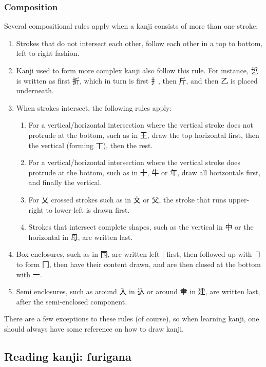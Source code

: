 \documentclass[11pt, b5paper, twoside, openright, onecolumn]{book}
\begin{document}
\subsubsection{Composition}


Several compositional rules apply when a kanji consists of more than one stroke:

\begin{enumerate}
\item Strokes that do not intersect each other‚ follow each other in a top to bottom‚ left to right fashion.
\item Kanji used to form more complex kanji also follow this rule. For instance‚ 乴 is written as first 折‚ which in turn is first 扌‚ then 斤‚ and then 乙 is placed underneath.
\item When strokes intersect‚ the following rules apply:
\begin{enumerate}
\item For a vertical/horizontal intersection where the vertical stroke does not protrude at the bottom‚ such as in 王‚ draw the top horizontal first‚ then the vertical (forming 丅)‚ then the rest.
\item For a vertical/horizontal intersection where the vertical stroke does protrude at the bottom‚ such as in 十‚ 牛 or 年‚ draw all horizontals first‚ and finally the vertical.
\item For 乂 crossed strokes such as in 文 or 父‚ the stroke that runs upper-right to lower-left is drawn first.
\item Strokes that intersect complete shapes‚ such as the vertical in 中 or the horizontal in 母‚ are written last.
\end{enumerate}
\item Box enclosures‚ such as in 国‚ are written left｜first‚ then followed up with ㇆ to form 冂‚ then have their content drawn‚ and are then closed at the bottom with 一.
\item Semi enclosures‚ such as around 入 in 込 or around 聿 in 建‚ are written last‚ after the semi-enclosed component.
\end{enumerate}

There are a few exceptions to these rules (of course)‚ so when learning kanji‚ one should always have some reference on how to draw kanji.

\subsection{Reading kanji: furigana}
\end{document}
